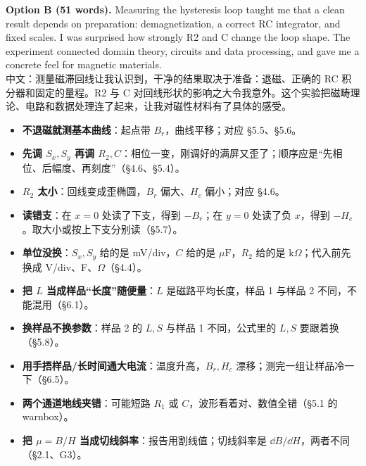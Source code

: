 \documentclass[11pt]{ctexart}
\begin{document}
\textbf{Option B (51 words).} Measuring the hysteresis loop taught me that a clean result depends on preparation: demagnetization, a correct RC integrator, and fixed scales. I was surprised how strongly R2 and C change the loop shape. The experiment connected domain theory, circuits and data processing, and gave me a concrete feel for magnetic materials.\\
中文：测量磁滞回线让我认识到，干净的结果取决于准备：退磁、正确的 RC 积分器和固定的量程。R2 与 C 对回线形状的影响之大令我意外。这个实验把磁畴理论、电路和数据处理连了起来，让我对磁性材料有了具体的感受。


\begin{itemize}
\item \textbf{不退磁就测基本曲线}：起点带 \(B_r\)，曲线平移；对应 §5.5、§5.6。
\item \textbf{先调 \(S_x,S_y\) 再调 \(R_2,C\)}：相位一变，刚调好的满屏又歪了；顺序应是“先相位、后幅度、再刻度”（§4.6、§5.4）。
\item \textbf{\(R_2\) 太小}：回线变成歪椭圆，\(B_r\) 偏大、\(H_c\) 偏小；对应 §4.6。
\item \textbf{读错支}：在 \(x=0\) 处读了下支，得到 \(-B_r\)；在 \(y=0\) 处读了负 \(x\)，得到 \(-H_c\)。取大小或按上下支分别读（§5.7）。
\item \textbf{单位没换}：\(S_x,S_y\) 给的是 mV/div，\(C\) 给的是 \(\mu\mathrm{F}\)，\(R_2\) 给的是 \(\mathrm{k}\Omega\)；代入前先换成 V/div、F、\(\Omega\)（§4.4）。
\item \textbf{把 \(L\) 当成样品“长度”随便量}：\(L\) 是磁路平均长度，样品 1 与样品 2 不同，不能混用（§6.1）。
\item \textbf{换样品不换参数}：样品 2 的 \(L,S\) 与样品 1 不同，公式里的 \(L,S\) 要跟着换（§5.8）。
\item \textbf{用手捂样品/长时间通大电流}：温度升高，\(B_r,H_c\) 漂移；测完一组让样品冷一下（§6.5）。
\item \textbf{两个通道地线夹错}：可能短路 \(R_1\) 或 \(C\)，波形看着对、数值全错（§5.1 的 warnbox）。
\item \textbf{把 \(\mu=B/H\) 当成切线斜率}：报告用割线值；切线斜率是 \(\dd B/\dd H\)，两者不同（§2.1、G3）。
\end{itemize}

\end{document}
